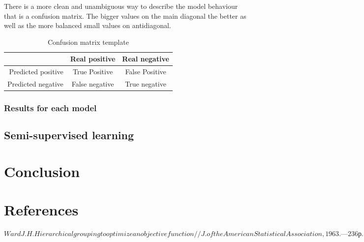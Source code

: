 \documentclass[11pt]{article}
\begin{document}
    There is a more clean and unambiguous way to describe the model behaviour that is a confusion matrix. The bigger values on the main diagonal the better as well as the more balanced small values on antidiagonal.

\begin{table}[htb]
\begin{center}
\begin{tabular}{ |r|c|c| }
\hline
& Real positive & Real negative \\ \hline
Predicted positive & True Positive 	& False Positive \\ \hline
Predicted negative & False negative & True negative \\ \hline
\end{tabular}
\caption{Confusion matrix template}
\end{center}
\end{table}
\FloatBarrier

\subsubsection{Results for each model}

\subsection{Semi-supervised learning}

\section{Conclusion}


\section{References}


$ Ward J.H. Hierarchical grouping to optimize an objective function // J. of the American Statistical Association, 1963. — 236 р. $
\end{document}
